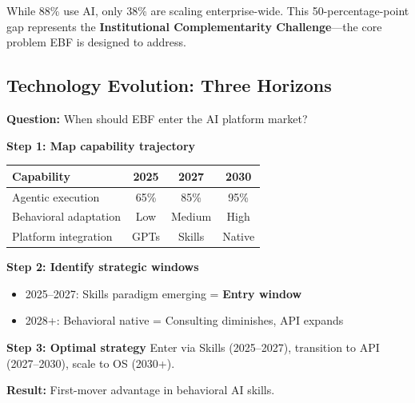 \begin{tcolorbox}[colback=blue!5,colframe=blue!50,title=Key Insight: The Institutional Gap]
While 88\% use AI, only 38\% are scaling enterprise-wide. This 50-percentage-point
gap represents the \textbf{Institutional Complementarity Challenge}---the core
problem EBF is designed to address.
\end{tcolorbox}


\subsection{Technology Evolution: Three Horizons}


\begin{tcolorbox}[colback=orange!5!white, colframe=orange!75!black,
    title=\textbf{Worked Example: Strategic Window Analysis}]

\textbf{Question:} When should EBF enter the AI platform market?

\textbf{Step 1: Map capability trajectory}
\begin{center}
\begin{tabular}{@{}lccc@{}}
Capability & 2025 & 2027 & 2030 \\
\hline
Agentic execution & 65\% & 85\% & 95\% \\
Behavioral adaptation & Low & Medium & High \\
Platform integration & GPTs & Skills & Native \\
\end{tabular}
\end{center}

\textbf{Step 2: Identify strategic windows}
\begin{itemize}[nosep]
    \item 2025--2027: Skills paradigm emerging = \textbf{Entry window}
    \item 2028+: Behavioral native = Consulting diminishes, API expands
\end{itemize}

\textbf{Step 3: Optimal strategy}
Enter via Skills (2025--2027), transition to API (2027--2030), scale to OS (2030+).

\textbf{Result:} First-mover advantage in behavioral AI skills.

\end{tcolorbox}

